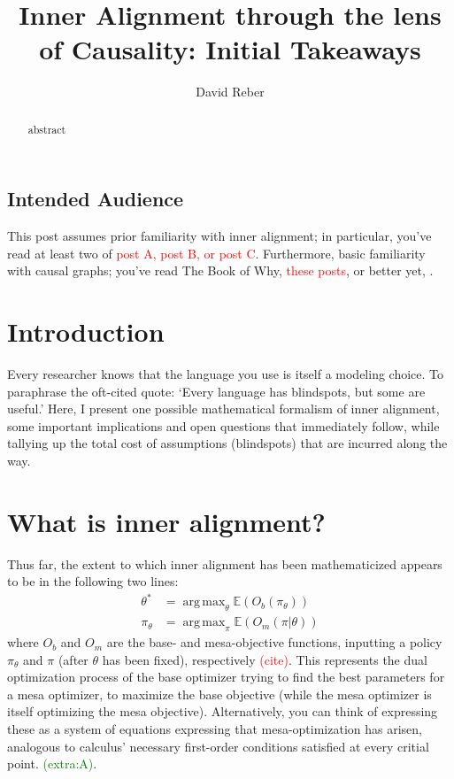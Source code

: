 \documentclass[letterpaper,10pt]{article}
\DeclareMathOperator*{\argmax}{arg\,max}
\newcommand\E{\mathbb{E}}
\begin{document}
\title{Inner Alignment through the lens of Causality: Initial Takeaways}

\author{David Reber}
\address{Columbia University}


\begin{abstract}
abstract
\end{abstract}


\subsection{Intended Audience}
This post assumes prior familiarity with inner alignment; in particular, you've read at least two of \textcolor{red}{post A, post B, or post C}. Furthermore, basic familiarity with causal graphs; you've read The Book of Why, \textcolor{red}{these posts}, or better yet, \cite{pearl_2009}.

\section{Introduction}
Every researcher knows that the language you use is itself a modeling choice.
To paraphrase the oft-cited quote: `Every language has blindspots, but some are useful.'
Here, I present one possible mathematical formalism of inner alignment, some important implications and open questions that immediately follow, while tallying up the total cost of assumptions (blindspots) that are incurred along the way.

\section{What is inner alignment?}
Thus far, the extent to which inner alignment has been mathematicized appears to be in the following two lines:
\begin{align}
\theta^* &= \argmax_\theta \E(O_b(\pi_\theta)) \\
\pi_\theta &= \argmax_\pi \E(O_m(\pi|\theta))
\end{align}
where $O_b$ and $O_m$ are the base- and mesa-objective functions, inputting a policy $\pi_\theta$ and $\pi$ (after $\theta$ has been fixed), respectively \textcolor{red}{(cite)}.
This represents the dual optimization process of the base optimizer trying to find the best parameters for a mesa optimizer, to maximize the base objective (while the mesa optimizer is itself optimizing the mesa objective).
Alternatively, you can think of expressing these as a system of equations expressing that mesa-optimization has arisen, analogous to calculus' necessary first-order conditions satisfied at every critial point. \textcolor{green}{(extra:A)}.
\end{document}
